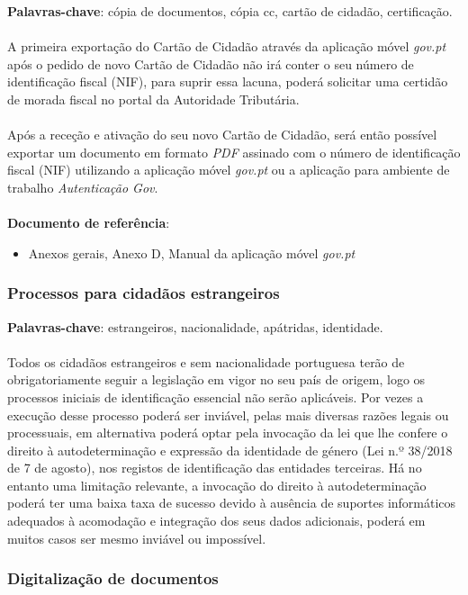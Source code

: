 \textbf{Palavras-chave}: cópia de documentos, cópia cc, cartão de cidadão, certificação. \\
\\
A primeira exportação do Cartão de Cidadão através da aplicação móvel
\emph{gov.pt} após o pedido de novo Cartão de Cidadão não irá conter o
seu número de identificação fiscal (NIF), para suprir essa lacuna,
poderá solicitar uma certidão de morada fiscal no portal da Autoridade
Tributária. \\
\\
Após a receção e ativação do seu novo Cartão de Cidadão, será então
possível exportar um documento em formato \emph{PDF} assinado com o
número de identificação fiscal (NIF) utilizando a aplicação móvel
\emph{gov.pt} ou a aplicação para ambiente de trabalho
\emph{Autenticação Gov}. \\
\\
\textbf{Documento de referência}:
\begin{itemize}
	\item Anexos gerais, Anexo D, Manual da aplicação móvel \emph{gov.pt}
\end{itemize}

\subsubsection{Processos para cidadãos estrangeiros}

\textbf{Palavras-chave}: estrangeiros, nacionalidade, apátridas, identidade. \\
\\
Todos os cidadãos estrangeiros e sem nacionalidade portuguesa terão de
obrigatoriamente seguir a legislação em vigor no seu país de origem,
logo os processos iniciais de identificação essencial não serão
aplicáveis. Por vezes a execução desse processo poderá ser inviável,
pelas mais diversas razões legais ou processuais, em alternativa poderá
optar pela invocação da lei que lhe confere o direito à autodeterminação
e expressão da identidade de género (Lei n.º 38/2018 de 7 de agosto),
nos registos de identificação das entidades terceiras. Há no entanto uma
limitação relevante, a invocação do direito à autodeterminação poderá
ter uma baixa taxa de sucesso devido à ausência de suportes informáticos
adequados à acomodação e integração dos seus dados adicionais, poderá em
muitos casos ser mesmo inviável ou impossível.

\subsubsection{Digitalização de documentos}

